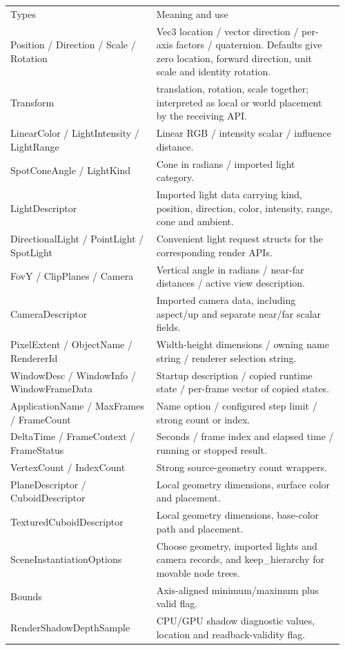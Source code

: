 \documentclass[11pt,a4paper]{article}
\begin{document}
{\small
\begin{longtable}{@{}p{0.42\linewidth}p{0.54\linewidth}@{}}
Types & Meaning and use \\
Position / Direction / Scale / Rotation & Vec3 location / vector direction / per-axis factors / quaternion. Defaults give zero location, forward direction, unit scale and identity rotation. \\
Transform & translation, rotation, scale together; interpreted as local or world placement by the receiving API. \\
LinearColor / LightIntensity / LightRange & Linear RGB / intensity scalar / influence distance. \\
SpotConeAngle / LightKind & Cone in radians / imported light category. \\
LightDescriptor & Imported light data carrying kind, position, direction, color, intensity, range, cone and ambient. \\
DirectionalLight / PointLight / SpotLight & Convenient light request structs for the corresponding render APIs. \\
FovY / ClipPlanes / Camera & Vertical angle in radians / near-far distances / active view description. \\
CameraDescriptor & Imported camera data, including aspect/up and separate near/far scalar fields. \\
PixelExtent / ObjectName / RendererId & Width-height dimensions / owning name string / renderer selection string. \\
WindowDesc / WindowInfo / WindowFrameData & Startup description / copied runtime state / per-frame vector of copied states. \\
ApplicationName / MaxFrames / FrameCount & Name option / configured step limit / strong count or index. \\
DeltaTime / FrameContext / FrameStatus & Seconds / frame index and elapsed time / running or stopped result. \\
VertexCount / IndexCount & Strong source-geometry count wrappers. \\
PlaneDescriptor / CuboidDescriptor & Local geometry dimensions, surface color and placement. \\
TexturedCuboidDescriptor & Local geometry dimensions, base-color path and placement. \\
SceneInstantiationOptions & Choose geometry, imported lights and camera records, and keep\_hierarchy for movable node trees. \\
Bounds & Axis-aligned minimum/maximum plus valid flag. \\
RenderShadowDepthSample & CPU/GPU shadow diagnostic values, location and readback-validity flag. \\
\end{longtable}
}
\end{document}
